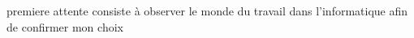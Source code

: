 \documentclass[a4paper, 11pt, french]{report}
\begin{document}
                                                                                                                                                              premiere
                                                                                                                                                              attente
                                                                                                                                                              consiste
                                                                                                                                                              à
                                                                                                                                                              observer
                                                                                                                                                              le
                                                                                                                                                              monde
                                                                                                                                                              du
                                                                                                                                                              travail
                                                                                                                                                              dans
                                                                                                                                                              l'informatique
                                                                                                                                                              afin
                                                                                                                                                              de
                                                                                                                                                              confirmer
                                                                                                                                                              mon
                                                                                                                                                              choix
\end{document}
